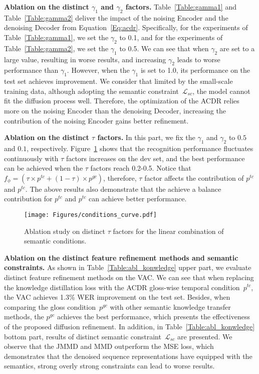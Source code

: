\documentclass[sigconf]{acmart}
\begin{document}
\noindent \textbf{Ablation on the distinct $\gamma_1$ and $\gamma_2$ factors.}
Table~\ref{Table:gamma1} and Table~\ref{Table:gamma2} deliver the impact of the noising Encoder and the denoising Decoder from Equation~\ref{Eq:acdr}.
Specifically, for the experiments of Table~\ref{Table:gamma1}, we set the $\gamma_2$ to 0.1, and  for the experiments of Table~\ref{Table:gamma2}, we set the $\gamma_1$ to 0.5.
We can see that when $\gamma_2$ are set to a large value, resulting in worse results, and increasing $\gamma_2$ leads to worse performance than $\gamma_1$.
However, when the $\gamma_1$ is set to 1.0, its performance on the test set achieves improvement.
We consider that limited by the small-scale training data, although adopting the semantic constraint~$\mathcal{L}_{sc}$, the model cannot fit the diffusion process well.
Therefore, the optimization of the ACDR relies more on the noising Encoder than the denoising Decoder, increasing the contribution of the noising Encoder gains better refinement.

\noindent \textbf{Ablation on the distinct $\tau$ factors.}
In this part, we fix the $\gamma_1$ and $\gamma_2$ to $0.5$ and $0.1$, respectively.
Figure~\ref{Fig:tau} shows that the recognition performance fluctuates continuously with $\tau$ factors increases on the dev set, and the best performance can be achieved when the $\tau$ factors reach 0.2-0.5.
Notice that ~$f_\phi= (\tau  \times p^{tc}+(1-\tau) \times p^{gc})$, therefore, $\tau$ factor affects the
contribution of $p^{tc}$ and $p^{tc}$.
The above results also demonstrate that the achieve a balance contribution for $p^{tc}$ and $p^{tc}$ can achieve better performance.


\begin{figure}[h]
  \centering
  \texttt{[image: Figures/conditions\_curve.pdf]}
  \caption{Ablation study on distinct $\tau$ factors for the linear combination of semantic conditions.}
 \label{Fig:tau}
\end{figure}

\noindent \textbf{Ablation on the distinct feature refinement methods and semantic constraints.}
As shown in Table~\ref{Table:abl_konwledge} upper part, we evaluate distinct feature refinement methods on the VAC.
We can see that when replacing the knowledge distillation loss with the ACDR gloss-wise temporal condition~$p^{tc}$, the VAC achieves 1.3\% WER improvement on the test set.
Besides, when comparing the gloss condition~$p^{gc}$ with other semantic knowledge transfer methods, the $p^{gc}$ achieves the best performance, which presents the effectiveness of the proposed diffusion refinement.
In addition, in Table~\ref{Table:abl_konwledge} bottom part, results of distinct semantic constraint~$\mathcal{L}_{sc}$ are presented. 
We observe that the JMMD and MMD outperform the MSE loss, which demonstrates that the denoised sequence representations have equipped with the semantics, strong overly strong constraints can lead to worse results.
\end{document}

